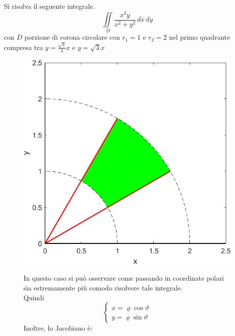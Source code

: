\begin{example}
    Si risolva il seguente integrale.
    \begin{equation*}
        \iint\limits_{D}{\frac{x^3y}{x^2+y^2}\,dx\,dy}
    \end{equation*}
    con $D$ porzione di corona circolare con $r_1=1$ e $r_2=2$ nel primo quadrante compresa tra $y=\tfrac{\sqrt{3}}{3}x$ e $y=\sqrt{3}x$
\begin{figure}[H]
    \begin{minipage}{0.3\textwidth}
   \centering
   \includegraphics[width=\textwidth]{Capitoli/Capitolo4/Integrale 2.png}
    \end{minipage}
    \hfill
    \begin{minipage}{0.55\textwidth}
    In questo caso si può osservare come passando in coordinate polari sia estremamente più comodo risolvere tale integrale.\\
    Quindi
    \begin{equation*}
        \begin{cases}
            x= \varrho \cos \vartheta\\
            y= \varrho \sin \vartheta
        \end{cases}
    \end{equation*}
    Inoltre, lo Jacobiano è:
    \begin{equation*}

\end{equation*}
\end{minipage}
\end{figure}
\end{example}
